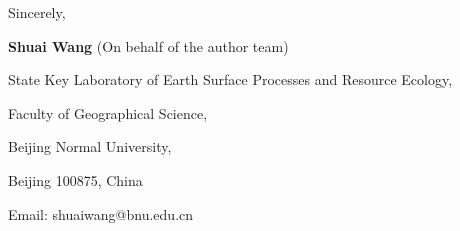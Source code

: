 \documentclass[11pt,a4paper,roman]{moderncv}
\begin{document}
\vspace{0.3cm}

Sincerely,

\textbf{Shuai Wang} (On behalf of the author team)


State Key Laboratory of Earth Surface Processes and Resource Ecology,

Faculty of Geographical Science,

Beijing Normal University,

Beijing 100875, China

Email: shuaiwang@bnu.edu.cn
\end{document}
